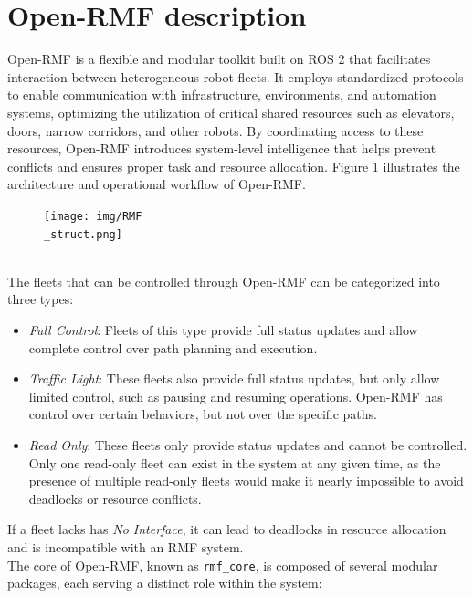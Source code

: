 \section{Open-RMF description}
Open-RMF is a flexible and modular toolkit built on ROS 2 that facilitates interaction between heterogeneous robot fleets. It employs standardized protocols to enable communication with infrastructure, environments, and automation systems, optimizing the utilization of critical shared resources such as elevators, doors, narrow corridors, and other robots. By coordinating access to these resources, Open-RMF introduces system-level intelligence that helps prevent conflicts and ensures proper task and resource allocation.
Figure \ref{fig:Open-RMF Structure} illustrates the architecture and operational workflow of Open-RMF.
\begin{figure}[h]
	\centering
	\texttt{[image: img/RMF\\\_struct.png]}
	\label{fig:Open-RMF Structure}
\end{figure}
\\
The fleets that can be controlled through Open-RMF can be categorized into three types:
\begin{itemize}
	\item \textit{Full Control}: Fleets of this type provide full status updates and allow complete control over path planning and execution.
	\item \textit{Traffic Light}: These fleets also provide full status updates, but only allow limited control, such as pausing and resuming operations. Open-RMF has control over certain behaviors, but not over the specific paths.
	\item \textit{Read Only}: These fleets only provide status updates and cannot be controlled. Only one read-only fleet can exist in the system at any given time, as the presence of multiple read-only fleets would make it nearly impossible to avoid deadlocks or resource conflicts.
\end{itemize}
If a fleet lacks has \textit{No Interface}, it can lead to deadlocks in resource allocation and is incompatible with an RMF system.
\\
The core of Open-RMF, known as \texttt{rmf\_core}, is composed of several modular packages, each serving a distinct role within the system:

